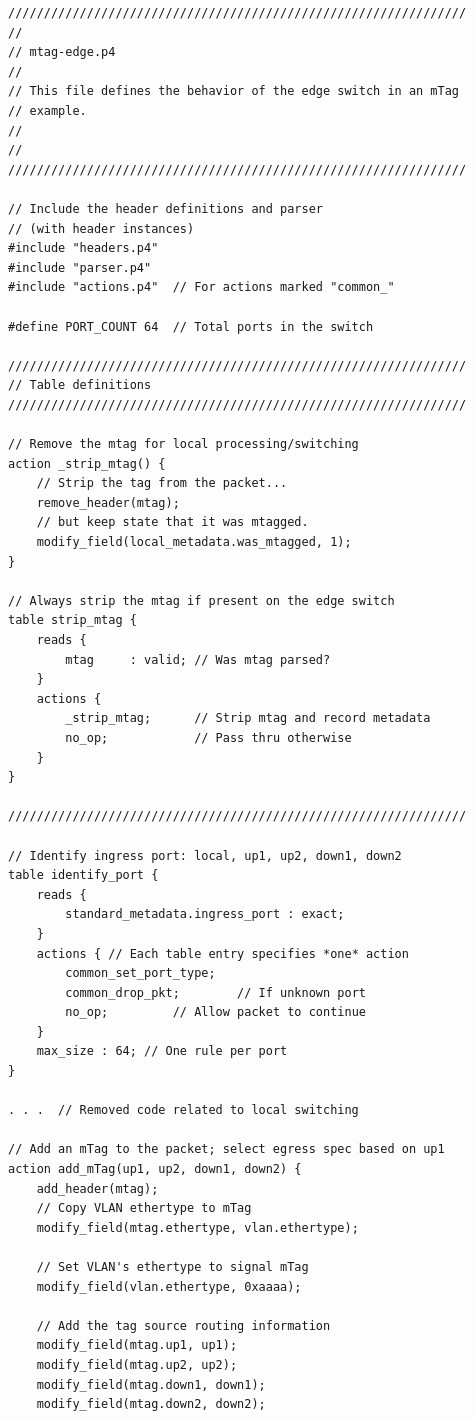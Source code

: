 \documentclass[12pt]{article}
\begin{document}
\begin{lstlisting}[keywords={},frame=single,escapechar=\@]
////////////////////////////////////////////////////////////////
//
// mtag-edge.p4
//
// This file defines the behavior of the edge switch in an mTag
// example.
//
//
////////////////////////////////////////////////////////////////

// Include the header definitions and parser
// (with header instances)
#include "headers.p4"
#include "parser.p4"
#include "actions.p4"  // For actions marked "common_"

#define PORT_COUNT 64  // Total ports in the switch

////////////////////////////////////////////////////////////////
// Table definitions
////////////////////////////////////////////////////////////////

// Remove the mtag for local processing/switching
action _strip_mtag() {
    // Strip the tag from the packet...
    remove_header(mtag);
    // but keep state that it was mtagged.
    modify_field(local_metadata.was_mtagged, 1);
}

// Always strip the mtag if present on the edge switch
table strip_mtag {
    reads {
        mtag     : valid; // Was mtag parsed?
    }
    actions {
        _strip_mtag;      // Strip mtag and record metadata
        no_op;            // Pass thru otherwise
    }
}

////////////////////////////////////////////////////////////////

// Identify ingress port: local, up1, up2, down1, down2
table identify_port {
    reads {
        standard_metadata.ingress_port : exact;
    }
    actions { // Each table entry specifies *one* action
        common_set_port_type;
        common_drop_pkt;        // If unknown port
        no_op;         // Allow packet to continue
    }
    max_size : 64; // One rule per port
}

. . .  // Removed code related to local switching

// Add an mTag to the packet; select egress spec based on up1
action add_mTag(up1, up2, down1, down2) {
    add_header(mtag);
    // Copy VLAN ethertype to mTag
    modify_field(mtag.ethertype, vlan.ethertype);

    // Set VLAN's ethertype to signal mTag
    modify_field(vlan.ethertype, 0xaaaa);

    // Add the tag source routing information
    modify_field(mtag.up1, up1);
    modify_field(mtag.up2, up2);
    modify_field(mtag.down1, down1);
    modify_field(mtag.down2, down2);


\end{lstlisting}
\end{document}
